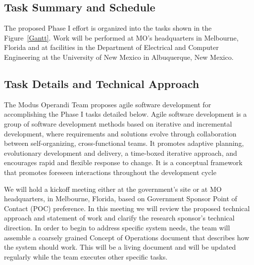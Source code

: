 \documentclass{sbir}
\begin{document}
\subsection{Task Summary and Schedule}
The proposed Phase I effort is organized into the tasks shown in the Figure~\ref{Gantt}. Work will be performed at MO's headquarters in Melbourne, Florida and at facilities in the Department of Electrical and Computer Engineering at the University of New Mexico in Albuquerque, New Mexico.

\begin{center}
\end{center}

\subsection{Task Details and Technical Approach}
The Modus Operandi Team proposes agile software development for accomplishing the Phase I tasks detailed below. Agile software development is a group of software development methods based on iterative and incremental development, where requirements and solutions evolve through collaboration between self-organizing, cross-functional teams. It promotes adaptive planning, evolutionary development and delivery, a time-boxed iterative approach, and encourages rapid and flexible response to change. It is a conceptual framework that promotes foreseen interactions throughout the development cycle~\cite{} 

We will hold a kickoff meeting either at the government's site or at MO headquarters, in Melbourne, Florida, based on Government Sponsor Point of Contact (POC) preference. In this meeting we will review the proposed technical approach and statement of work and clarify the research sponsor's technical direction. In order to begin to address specific system needs, the team will assemble a coarsely grained Concept of Operations document that describes how the system should work. This will be a living document and will be updated regularly while the team executes other specific tasks. 
\end{document}
